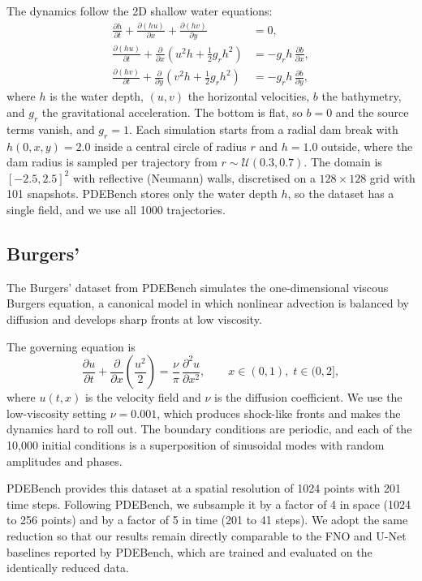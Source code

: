 \documentclass{article}
\begin{document}
The dynamics follow the 2D shallow water equations:
\begin{align}
  \frac{\partial h}{\partial t} + \frac{\partial (hu)}{\partial x} + \frac{\partial (hv)}{\partial y} &= 0, \\
  \frac{\partial (hu)}{\partial t} + \frac{\partial}{\partial x}\!\left(u^2 h + \tfrac{1}{2} g_r h^2\right) &= -g_r h\, \frac{\partial b}{\partial x}, \\
  \frac{\partial (hv)}{\partial t} + \frac{\partial}{\partial y}\!\left(v^2 h + \tfrac{1}{2} g_r h^2\right) &= -g_r h\, \frac{\partial b}{\partial y},
\end{align}
where $h$ is the water depth, $(u, v)$ the horizontal velocities, $b$ the bathymetry, and $g_r$ the gravitational acceleration. The bottom is flat, so $b = 0$ and the source terms vanish, and $g_r = 1$. Each simulation starts from a radial dam break with $h(0, x, y) = 2.0$ inside a central circle of radius $r$ and $h = 1.0$ outside, where the dam radius is sampled per trajectory from $r \sim \mathcal{U}(0.3, 0.7)$. The domain is $[-2.5, 2.5]^2$ with reflective (Neumann) walls, discretised on a $128 \times 128$ grid with 101 snapshots. PDEBench stores only the water depth $h$, so the dataset has a single field, and we use all 1000 trajectories.

\subsection{Burgers'}
The Burgers' dataset from PDEBench \citep{takamoto2022pdebench} simulates the one-dimensional viscous Burgers equation, a canonical model in which nonlinear advection is balanced by diffusion and develops sharp fronts at low viscosity.

The governing equation is
\begin{equation}
  \frac{\partial u}{\partial t} + \frac{\partial}{\partial x}\!\left(\frac{u^2}{2}\right) = \frac{\nu}{\pi}\,\frac{\partial^2 u}{\partial x^2}, \qquad x \in (0, 1),\; t \in (0, 2],
\end{equation}
where $u(t, x)$ is the velocity field and $\nu$ is the diffusion coefficient. We use the low-viscosity setting $\nu = 0.001$, which produces shock-like fronts and makes the dynamics hard to roll out. The boundary conditions are periodic, and each of the 10{,}000 initial conditions is a superposition of sinusoidal modes with random amplitudes and phases.

PDEBench provides this dataset at a spatial resolution of 1024 points with 201 time steps. Following PDEBench, we subsample it by a factor of 4 in space (1024 to 256 points) and by a factor of 5 in time (201 to 41 steps). We adopt the same reduction so that our results remain directly comparable to the FNO and U-Net baselines reported by PDEBench, which are trained and evaluated on the identically reduced data.
\end{document}

